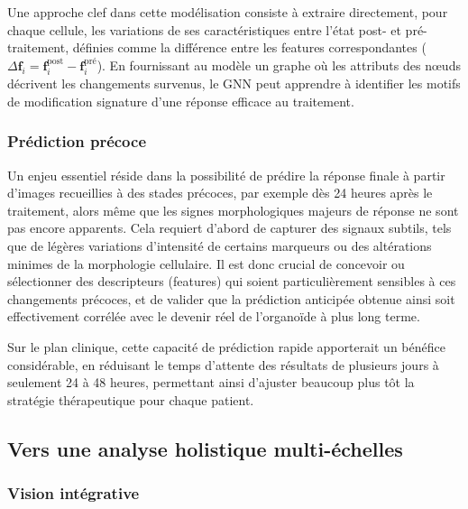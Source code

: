 Une approche clef dans cette modélisation consiste à extraire directement, pour chaque cellule, les variations de ses caractéristiques entre l’état post- et pré-traitement, définies comme la différence entre les features correspondantes (\(\Delta \mathbf{f}_i = \mathbf{f}_i^{\text{post}} - \mathbf{f}_i^{\text{pré}}\)). En fournissant au modèle un graphe où les attributs des nœuds décrivent les changements survenus, le GNN peut apprendre à identifier les motifs de modification signature d’une réponse efficace au traitement.

\subsubsection{Prédiction précoce}

Un enjeu essentiel réside dans la possibilité de prédire la réponse finale à partir d’images recueillies à des stades précoces, par exemple dès 24 heures après le traitement, alors même que les signes morphologiques majeurs de réponse ne sont pas encore apparents. Cela requiert d’abord de capturer des signaux subtils, tels que de légères variations d’intensité de certains marqueurs ou des altérations minimes de la morphologie cellulaire. Il est donc crucial de concevoir ou sélectionner des descripteurs (features) qui soient particulièrement sensibles à ces changements précoces, et de valider que la prédiction anticipée obtenue ainsi soit effectivement corrélée avec le devenir réel de l’organoïde à plus long terme.

Sur le plan clinique, cette capacité de prédiction rapide apporterait un bénéfice considérable, en réduisant le temps d’attente des résultats de plusieurs jours à seulement 24 à 48 heures, permettant ainsi d’ajuster beaucoup plus tôt la stratégie thérapeutique pour chaque patient.

\subsection{Vers une analyse holistique multi-échelles}

\subsubsection{Vision intégrative}

